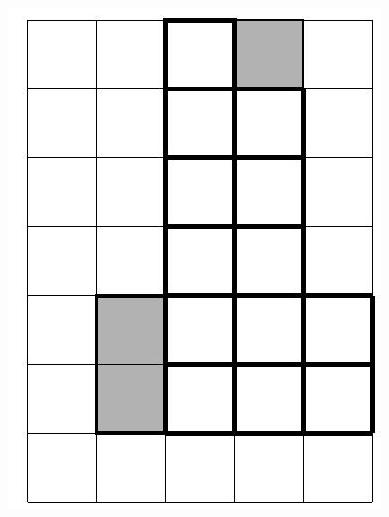 \documentclass[10pt]{article}
\begin{document}
\includegraphics[max width=\textwidth, center]{2024_11_21_e9b4faa005d5be2cc318g-159(1)}\\
\end{document}
